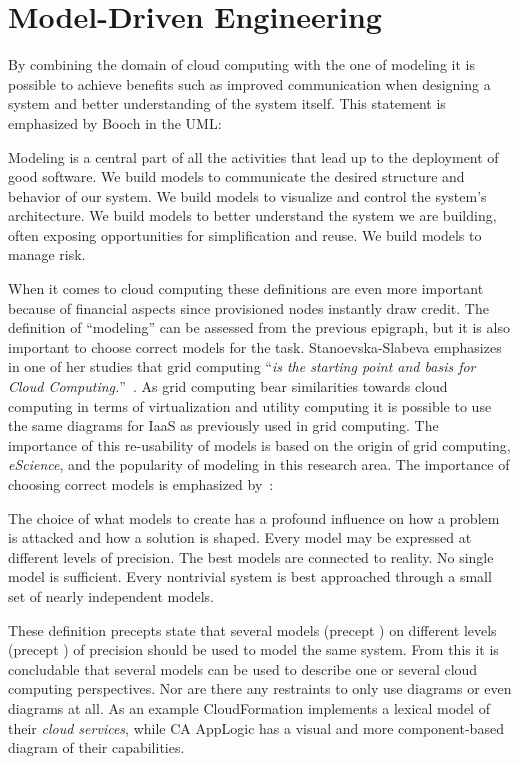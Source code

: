 \section{Model-Driven Engineering}

By combining the domain of cloud computing with the one of modeling 
it is possible to achieve benefits such as improved communication when designing 
a system and better understanding of the system itself.
This statement is emphasized by Booch \etal in the UML:
\epigraph{
  Modeling is a central
  part of all the activities that lead up to the deployment of good
  software. We build models to communicate the desired structure and
  behavior of our system. We build models to visualize and control the
  system's architecture. We build models to better understand the
  system we are building, often exposing opportunities for
  simplification and reuse. We build models to manage risk.
}{\cite{unified:booch05}}
When it comes to cloud computing these definitions are even more important
because of financial aspects since provisioned nodes instantly draw credit.
The definition of ``modeling'' can be assessed from the previous epigraph, but it is 
also important to choose correct models for the task.
Stanoevska-Slabeva emphasizes in one of her studies that grid computing
``\emph{is the starting point and basis for Cloud Computing.}''~\cite{introduction:wozniak10}.
As grid computing bear similarities towards cloud computing in terms of virtualization 
and utility computing
it is possible to use the same  diagrams for IaaS as previously used in grid computing.
The importance of this re-usability of models is based on the origin of grid computing, 
\emph{eScience},
and the popularity of modeling in this research area.
The importance of choosing correct models is emphasized by~\cite{unified:booch05}:
\epigraph{
  \begin{ii}\iitem The choice
  of what models to create has a profound influence on how a problem
  is attacked and how a solution is shaped. \iitem Every model may be
  expressed at different levels of precision. \iitem The best models
  are connected to reality. \iitem No single model is
  sufficient. Every nontrivial system is best approached through a
  small set of nearly independent models.\end{ii}
}{\cite{unified:booch05}}
These definition precepts state that several models (precept ) on different levels (precept ) 
of precision should be used to model the same system.
From this it is concludable that several models can be used to describe one or several cloud computing perspectives.
Nor are there any restraints to only use  diagrams or even diagrams at all.
As an example  CloudFormation implements a lexical model of their \emph{cloud services},
while CA AppLogic has a visual and more  component-based diagram of their capabilities.

